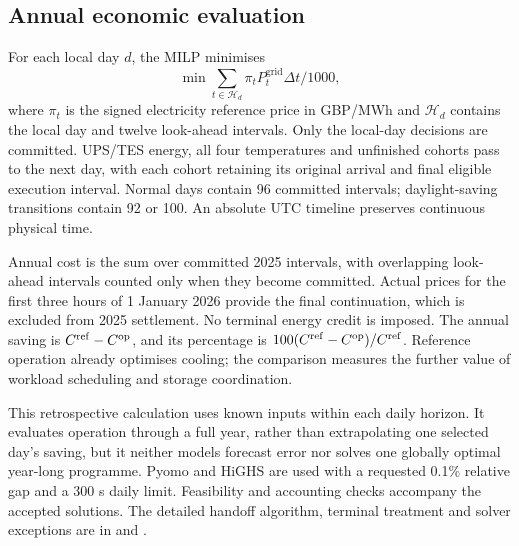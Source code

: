 \subsection{Annual economic evaluation}
For each local day $d$, the MILP minimises
\begin{equation}
\min\sum_{t\in\mathcal H_d}\pi_tP_t^{\mathrm{grid}}\Delta t/1000,
\label{eq:objective}
\end{equation}
where $\pi_t$ is the signed electricity reference price in GBP/MWh and $\mathcal H_d$ contains the local day and twelve look-ahead intervals. Only the local-day decisions are committed. UPS/TES energy, all four temperatures and unfinished cohorts pass to the next day, with each cohort retaining its original arrival and final eligible execution interval. Normal days contain 96 committed intervals; daylight-saving transitions contain 92 or 100. An absolute UTC timeline preserves continuous physical time.

Annual cost is the sum over committed 2025 intervals, with overlapping look-ahead intervals counted only when they become committed. Actual prices for the first three hours of 1 January 2026 provide the final continuation, which is excluded from 2025 settlement. No terminal energy credit is imposed. The annual saving is $C^{\mathrm{ref}}-C^{\mathrm{op}}$, and its percentage is $100(C^{\mathrm{ref}}-C^{\mathrm{op}})/C^{\mathrm{ref}}$. Reference operation already optimises cooling; the comparison measures the further value of workload scheduling and storage coordination.

This retrospective calculation uses known inputs within each daily horizon. It evaluates operation through a full year, rather than extrapolating one selected day's saving, but it neither models forecast error nor solves one globally optimal year-long programme. Pyomo and HiGHS are used with a requested 0.1\% relative gap and a 300 s daily limit. Feasibility and accounting checks accompany the accepted solutions. The detailed handoff algorithm, terminal treatment and solver exceptions are in  and .
